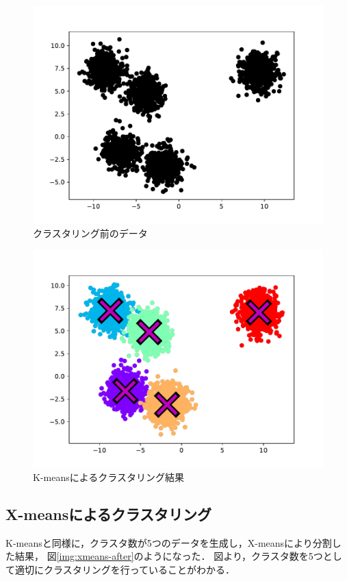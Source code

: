 \documentclass[10pt,a4j]{ltjsarticle}
\def\figref#1{図\ref{#1}}
\begin{document}
\begin{figure}[htbp]
  \begin{center}
    \includegraphics[width=0.8\linewidth]{img/k-means/before.pdf}
    \caption{クラスタリング前のデータ}
    \label{img:kmeans-before}
  \end{center}
\end{figure}
\begin{figure}[htbp]
  \begin{center}
    \includegraphics[width=0.8\linewidth]{img/k-means/after.pdf}
    \caption{K-meansによるクラスタリング結果}
    \label{img:kmeans-after}
  \end{center}
\end{figure}

\subsection{X-meansによるクラスタリング}
K-meansと同様に，クラスタ数が5つのデータを生成し，X-meansにより分割した結果，
\figref{img:xmeans-after}のようになった．
図より，クラスタ数を5つとして適切にクラスタリングを行っていることがわかる．
\end{document}
